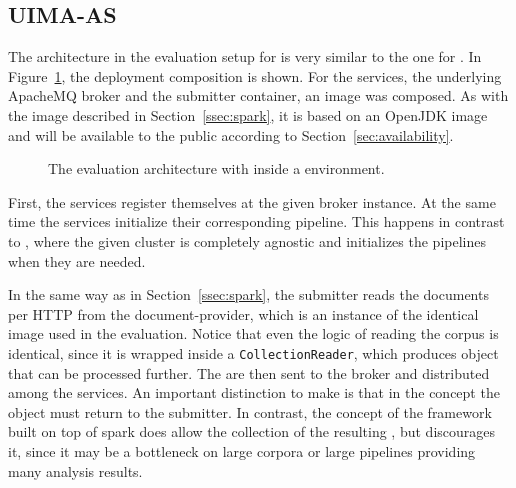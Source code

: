 \subsection{UIMA-AS}
The \docker{} architecture in the evaluation setup for \uimaas{} is very similar to the one for \spark{}. In Figure~\ref{fig:arch-uimaas}, the deployment composition is shown. For the \uimaas{} services, the underlying ApacheMQ broker and the submitter container, an \uimaas{} \docker{} image was composed. As with the \spark{} image described in Section~\ref{ssec:spark}, it is based on an OpenJDK image and will be available to the public according to Section~\ref{sec:availability}.
\begin{figure}[htb]
	\centering
	
	\caption[The evaluation architecture with UIMA-AS inside a Docker environment.]{The evaluation architecture with \uimaas{} inside a \docker{} environment.}
	\label{fig:arch-uimaas}
\end{figure}
First, the \uimaas{} services register themselves at the given broker instance. At the same time the services initialize their corresponding pipeline. This happens in contrast to \spark{}, where the given cluster is completely \uima{} agnostic and initializes the pipelines when they are needed.

In the same way as in Section~\ref{ssec:spark}, the submitter reads the documents per HTTP from the document-provider, which is an instance of the identical image used in the \spark{} evaluation. Notice that even the logic of reading the corpus is identical, since it is wrapped inside a \lstinline|CollectionReader|, which produces \cas{} object that can be processed further. The \cas{} are then sent to the broker and distributed among the services. An important distinction to make is that in the \uimaas{} concept the \cas{} object must return to the submitter. In contrast, the concept of the framework built on top of spark does allow the collection of the resulting \cas{}, but discourages it, since it may be a bottleneck on large corpora or large pipelines providing many analysis results.

